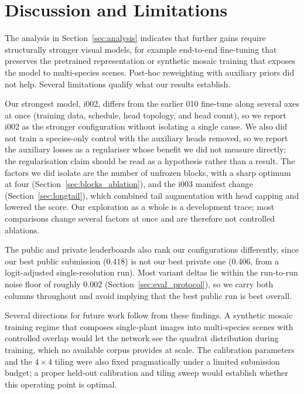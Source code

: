 \chapter{Discussion and Limitations}
\label{sec:discussion}

The analysis in Section~\ref{sec:analysis} indicates that further gains require structurally stronger visual models, for example end-to-end fine-tuning that preserves the pretrained representation or synthetic mosaic training that exposes the model to multi-species scenes. Post-hoc reweighting with auxiliary priors did not help. Several limitations qualify what our results establish.

Our strongest model, i002, differs from the earlier 010 fine-tune along several axes at once (training data, schedule, head topology, and head count), so we report i002 as the stronger configuration without isolating a single cause. We also did not train a species-only control with the auxiliary heads removed, so we report the auxiliary losses as a regulariser whose benefit we did not measure directly; the regularisation claim should be read as a hypothesis rather than a result. The factors we did isolate are the number of unfrozen blocks, with a sharp optimum at four (Section~\ref{sec:blocks_ablation}), and the i003 manifest change (Section~\ref{sec:longtail}), which combined tail augmentation with head capping and lowered the score. Our exploration as a whole is a development trace; most comparisons change several factors at once and are therefore not controlled ablations.

The public and private leaderboards also rank our configurations differently, since our best public submission ($0.418$) is not our best private one ($0.406$, from a logit-adjusted single-resolution run). Most variant deltas lie within the run-to-run noise floor of roughly $0.002$ (Section~\ref{sec:eval_protocol}), so we carry both columns throughout and avoid implying that the best public run is best overall.

Several directions for future work follow from these findings. A synthetic mosaic training regime that composes single-plant images into multi-species scenes with controlled overlap would let the network see the quadrat distribution during training, which no available corpus provides at scale. The calibration parameters and the $4{\times}4$ tiling were also fixed pragmatically under a limited submission budget; a proper held-out calibration and tiling sweep would establish whether this operating point is optimal.
